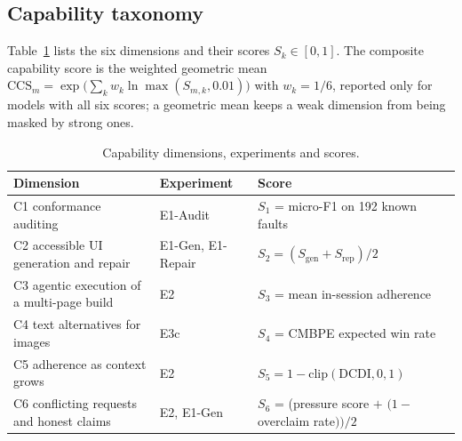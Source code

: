 \documentclass[conference]{IEEEtran}
\begin{document}
\subsection{Capability taxonomy}
Table~\ref{tab:taxonomy} lists the six dimensions and their scores $S_k\in[0,1]$. The composite
capability score is the weighted geometric mean
$\mathrm{CCS}_m = \exp\big(\sum_k w_k \ln \max(S_{m,k}, 0.01)\big)$ with $w_k = 1/6$, reported
only for models with all six scores; a geometric mean keeps a weak dimension from being
masked by strong ones.

\begin{table}[t]
\caption{Capability dimensions, experiments and scores.}
\label{tab:taxonomy}
\centering\footnotesize
\begin{tabular}{@{}p{}p{}p{}@{}}
\toprule
Dimension & Experiment & Score \\
\midrule
C1 conformance auditing & E1-Audit & $S_1$ = micro-F1 on 192 known faults\\
C2 accessible UI generation and repair & E1-Gen, E1-Repair & $S_2 = (S_\text{gen}+S_\text{rep})/2$\\
C3 agentic execution of a multi-page build & E2 & $S_3$ = mean in-session adherence\\
C4 text alternatives for images & E3c & $S_4$ = CMBPE expected win rate\\
C5 adherence as context grows & E2 & $S_5 = 1-\mathrm{clip}(\mathrm{DCDI},0,1)$\\
C6 conflicting requests and honest claims & E2, E1-Gen & $S_6$ = (pressure score $+$ $(1-$overclaim rate$))/2$\\
\bottomrule
\end{tabular}
\end{table}
\end{document}
